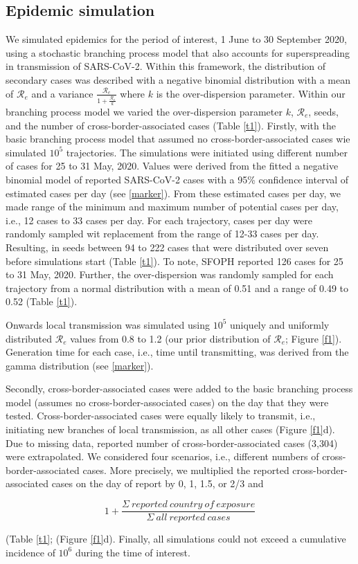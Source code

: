 \documentclass[10pt, a4paper, twoside]{article}
\begin{document}
\begin{multicols}{2}
\subsection{Epidemic simulation}
We simulated epidemics for the period of interest, 1 June to 30 September 2020, using a stochastic branching process model that also accounts for superspreading in transmission of SARS-CoV-2.
Within this framework, the distribution of secondary cases was described with a negative binomial distribution with a mean of $\mathcal{R}_e$ and a variance $\frac{\mathcal{R}_e}{1+\frac{\mathcal{R}_e}{k}}$ where $k$ is the over-dispersion parameter.
Within our branching process model we varied the over-dispersion parameter $k$, $\mathcal{R}_e$, seeds, and the number of cross-border-associated cases (Table \ref{t1}).
Firstly, with the basic branching process model that assumed no cross-border-associated cases wie simulated $10^5$ trajectories.
The simulations were initiated using different number of cases for 25 to 31 May, 2020.
Values were derived from the fitted a negative binomial model of reported SARS-CoV-2 cases with a 95\% confidence interval of estimated cases per day (see \ref{marker}).
From these estimated cases per day, we made range of the minimum and maximum number of potential cases per day, i.e., 12 cases to 33 cases per day. 
For each trajectory, cases per day were randomly sampled wit replacement from the range of 12-33 cases per day.
Resulting, in seeds between 94 to 222 cases that were distributed over seven before simulations start (Table \ref{t1}).
To note, SFOPH reported 126 cases for 25 to 31 May, 2020.
Further, the over-dispersion was randomly sampled for each trajectory from a normal distribution with a mean of 0.51 and a range of 0.49 to 0.52 (Table \ref{t1}).\cite{laxminarayan_epidemiology_2020}

Onwards local transmission was simulated using $10^5$ uniquely and uniformly distributed $\mathcal{R}_e$ values from 0.8 to 1.2 (our prior distribution of $\mathcal{R}_e$; Figure \ref{f1}).
Generation time for each case, i.e., time until transmitting, was derived from the gamma distribution (see \ref{marker}).

Secondly, cross-border-associated cases were added to the basic branching process model (assumes no cross-border-associated cases) on the day that they were tested.
Cross-border-associated cases were equally likely to transmit, i.e., initiating new branches of local transmission, as all other cases (Figure \ref{f1}d).
Due to missing data, reported number of cross-border-associated cases (3,304) were extrapolated.
We considered four scenarios, i.e., different numbers of cross-border-associated cases.
More precisely, we multiplied the reported cross-border-associated cases on the day of report by 0, 1, 1.5, or 2/3 and
\begin{small} \[ 1+ {\frac{\Sigma~reported ~country ~of ~exposure }{\Sigma~all ~reported ~cases}}\] \end{small} (Table \ref{t1}; (Figure \ref{f1}d).
Finally, all simulations could not exceed a cumulative incidence of $10^6$ during the time of interest.


\end{multicols}
\end{document}
